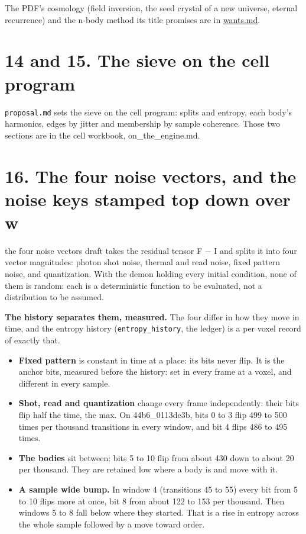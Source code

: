The PDF's cosmology (field inversion, the seed crystal of a new universe, eternal recurrence) and the n-body method its title promises are in \hyperref[chap:wants]{wants.md}.

\section{\texorpdfstring{14 and 15. The sieve on the cell program}{14 and 15. The sieve on the cell program}}

\texttt{proposal.\allowbreak{}md} sets the sieve on the cell program: splits and entropy, each body's harmonics, edges by jitter and membership by sample coherence. Those two sections are in the cell workbook, on\_\allowbreak{}the\_\allowbreak{}engine.md.

\section{\texorpdfstring{16. The four noise vectors, and the noise keys stamped top down over w}{16. The four noise vectors, and the noise keys stamped top down over w}}

the four noise vectors draft takes the residual tensor F − I and splits it into four vector magnitudes: photon shot noise, thermal and read noise, fixed pattern noise, and quantization. With the demon holding every initial condition, none of them is random: each is a deterministic function to be evaluated, not a distribution to be assumed.

\textbf{The history separates them, measured.} The four differ in how they move in time, and the entropy history (\texttt{entropy\_\allowbreak{}history}, the ledger) is a per voxel record of exactly that.

\begin{itemize}
\item \textbf{Fixed pattern} is constant in time at a place: its bits never flip. It is the anchor bits, measured before the history: set in every frame at a voxel, and different in every sample.
\item \textbf{Shot, read and quantization} change every frame independently: their bits flip half the time, the max. On 44b6\_\allowbreak{}0113de3b, bits 0 to 3 flip 499 to 500 times per thousand transitions in every window, and bit 4 flips 486 to 495 times.
\item \textbf{The bodies} sit between: bits 5 to 10 flip from about 430 down to about 20 per thousand. They are retained low where a body is and move with it.
\item \textbf{A sample wide bump.} In window 4 (transitions 45 to 55) every bit from 5 to 10 flips more at once, bit 8 from about 122 to 153 per thousand. Then windows 5 to 8 fall below where they started. That is a rise in entropy across the whole sample followed by a move toward order.
\end{itemize}

